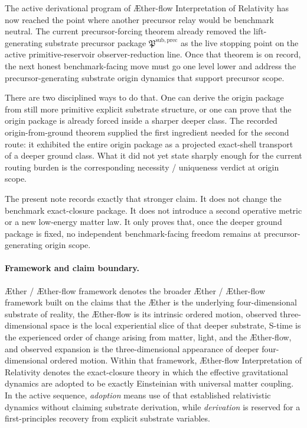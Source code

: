 \documentclass[11pt]{article}
\newcommand{\Aether}{\AE{}ther}
\newcommand{\Aflow}{\AE{}ther-flow}
\newcommand{\TheoryName}{\Aflow{} Interpretation of Relativity}
\newcommand{\TheoryProgram}{\Aether{} / \Aflow{} framework}
\newcommand{\PrecursorPackage}{\mathfrak P^{\mathrm{sub,prec}}}
\begin{document}
The active derivational program of \TheoryName{} has now reached the point where another precursor relay would be benchmark neutral. The current precursor-forcing theorem already removed the lift-generating substrate precursor package \(\PrecursorPackage\) as the live stopping point on the active primitive-reservoir observer-reduction line. Once that theorem is on record, the next honest benchmark-facing move must go one level lower and address the precursor-generating substrate origin dynamics that support precursor scope.

There are two disciplined ways to do that. One can derive the origin package from still more primitive explicit substrate structure, or one can prove that the origin package is already forced inside a sharper deeper class. The recorded origin-from-ground theorem supplied the first ingredient needed for the second route: it exhibited the entire origin package as a projected exact-shell transport of a deeper ground class. What it did not yet state sharply enough for the current routing burden is the corresponding necessity / uniqueness verdict at origin scope.

The present note records exactly that stronger claim. It does not change the benchmark exact-closure package. It does not introduce a second operative metric or a new low-energy matter law. It only proves that, once the deeper ground package is fixed, no independent benchmark-facing freedom remains at precursor-generating origin scope.

\paragraph{Framework and claim boundary.}
\TheoryProgram{} denotes the broader \Aether{} / \Aflow{} framework built on the claims that the \Aether{} is the underlying four-dimensional substrate of reality, the \Aflow{} is its intrinsic ordered motion, observed three-dimensional space is the local experiential slice of that deeper substrate, S-time is the experienced order of change arising from matter, light, and the \Aflow{}, and observed expansion is the three-dimensional appearance of deeper four-dimensional ordered motion. Within that framework, \TheoryName{} denotes the exact-closure theory in which the effective gravitational dynamics are adopted to be exactly Einsteinian with universal matter coupling. In the active sequence, \emph{adoption} means use of that established relativistic dynamics without claiming substrate derivation, while \emph{derivation} is reserved for a first-principles recovery from explicit substrate variables.
\end{document}
